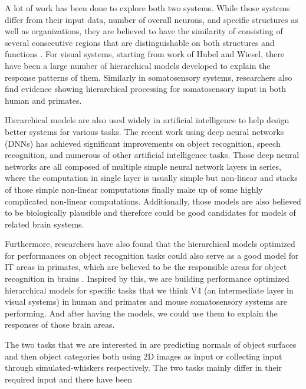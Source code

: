\documentclass[12pt]{article}
\begin{document}
A lot of work has been done to explore both two systems. While those systems differ from their input data, number of overall neurons, and specific structures as well as organizations, they are believed to have the similarity of consisting of several consecutive regions that are distinguishable on both structures and functions \cite{felleman1991distributed}. 
For visual systems, starting from work of Hubel and Wiesel\cite{Hubel1959}, there have been a large number of hierarchical models developed to explain the response patterns of them\cite{riesenhuber1999hierarchical, serre2007feedforward, fukushima1980neocognitron, bengio2009learning, pinto2009high}.
Similarly in somatosensory systems, researchers also find evidence showing hierarchical processing for somatosensory input in both human and primates\cite{Pons1987, Inui2004, Iwamura1998}. 

Hierarchical models are also used widely in artificial intelligence to help design better systems for various tasks. The recent work using deep neural networks (DNNs) has achieved significant improvements on object recognition, speech recognition, and numerous of other artificial intelligence tasks\cite{Krizhevsky, hinton2012deep, lecun2015deep}. Those deep neural networks are all composed of multiple simple neural network layers in series, where the computation in single layer is usually simple but non-linear and stacks of those simple non-linear computations finally make up of some highly complicated non-linear computations. Additionally, those models are also believed to be biologically plausible and therefore could be good candidates for models of related brain systems.

Furthermore, researchers have also found that the hierarchical models optimized for performances on object recognition tasks could also serve as a good model for IT areas in primates, which are believed to be the responsible areas for object recognition in brains \cite{Yamins2013, Yamins2014, Cadieu2014}. Inspired by this, we are building performance optimized hierarchical models for specific tasks that we think V4 (an intermediate layer in visual systems) in human and primates and mouse somatosensory systems are performing. And after having the models, we could use them to explain the responses of those brain areas. 

The two tasks that we are interested in are predicting normals of object surfaces and then object categories both using 2D images as input or collecting input through simulated-whiskers respectively. The two tasks mainly differ in their required input and there have been 
\end{document}
